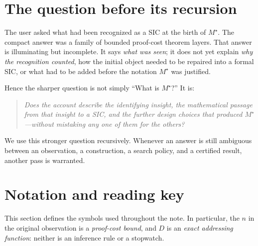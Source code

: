 \documentclass[11pt,letterpaper]{article}
\newcommand{\Ms}{M^{\star}}
\begin{document}
\section{The question before its recursion}
The user asked what had been recognized as a SIC at the birth of $\Ms$. The compact answer was a family of bounded proof-cost theorem layers. That answer is illuminating but incomplete. It says \emph{what was seen}; it does not yet explain \emph{why the recognition counted}, how the initial object needed to be repaired into a formal SIC, or what had to be added before the notation $\Ms$ was justified.

Hence the sharper question is not simply ``What is $\Ms$?'' It is:
\begin{quote}
\emph{Does the account describe the identifying insight, the mathematical passage from that insight to a SIC, and the further design choices that produced $\Ms$---without mistaking any one of them for the others?}
\end{quote}
We use this stronger question recursively. Whenever an answer is still ambiguous between an observation, a construction, a search policy, and a certified result, another pass is warranted.

\section{Notation and reading key}
This section defines the symbols used throughout the note. In particular, the $n$ in the original observation is a \emph{proof-cost bound}, and $D$ is an \emph{exact addressing function}: neither is an inference rule or a stopwatch.
\end{document}
